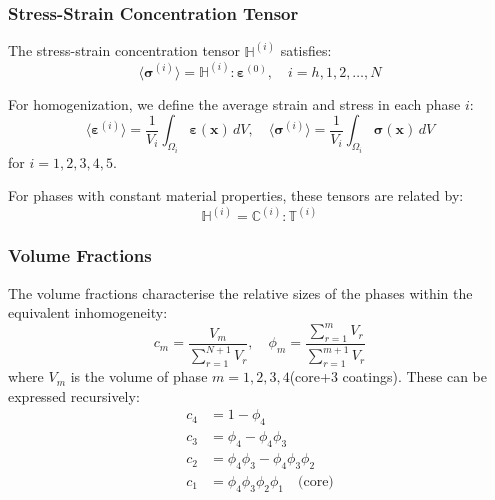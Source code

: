 \documentclass[oneside, 12pt, a4paper, bibliography=totoc]{book}
\newcommand{\bs}[1]{\bm{#1}}                       %
\begin{document}
\subsubsection{Stress-Strain Concentration Tensor}
\label{subsec:stress_concentration}

The stress-strain concentration tensor $\mathbb{H}^{(i)}$ satisfies:
%
\begin{equation}
   \langle \bs{\sigma}^{(i)} \rangle = \mathbb{H}^{(i)} : \bs{\varepsilon}^{(0)}, \quad i = h, 1, 2, \ldots, N
    \label{eq:stress_concentration}
\end{equation}

For homogenization, we define the average strain and stress in each phase $i$:
%
\begin{equation}
    \langle \bs{\varepsilon}^{(i)} \rangle = \frac{1}{V_i} \int_{\Omega_i} \bs{\varepsilon}(\bs{x}) \, dV, \quad
    \langle\bs{\sigma}^{(i)}  \rangle = \frac{1}{V_i} \int_{\Omega_i} \bs{\sigma}(\bs{x}) \, dV
    \label{eq:average_fields}
\end{equation}
%
for $i = 1, 2, 3, 4, 5$.

For phases with constant material properties, these tensors are related by:
%
\begin{equation}
    \mathbb{H}^{(i)} = \mathbb{C}^{(i)} : \mathbb{T}^{(i)}
    \label{eq:H_T_relation}
\end{equation}

\subsubsection{Volume Fractions}
\label{subsec:volume_fractions}

The volume fractions characterise the relative sizes of the phases within the equivalent inhomogeneity:
%
\begin{equation}
    c_m = \frac{V_m}{\sum_{r=1}^{N+1} V_r}, \quad
    \phi_m = \frac{\sum_{r=1}^{m} V_r}{\sum_{r=1}^{m+1} V_r}
    \label{eq:volume_fractions_general}
\end{equation}
%
where $V_m$ is the volume of phase $m = 1,2,3,4$(core+3 coatings). These can be expressed recursively:
%
\begin{align}
    c_4 &= 1 - \phi_4 \nonumber \\
    c_{3} &= \phi_4 - \phi_4 \phi_{3} \nonumber\\
    c_{2} &= \phi_4 \phi_{3} - \phi_4 \phi_{3} \phi_{2} \nonumber\\
    c_1 &= \phi_4 \phi_{3}\phi_2 \phi_1 \quad \text{(core)}
    \label{eq:volume_fractions_recursive}
\end{align}
\end{document}

